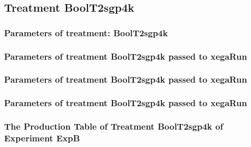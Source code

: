 \documentclass[18pt,c]{beamer}
\makeatletter
\def\beamer@writeslidentry@miniframesoff{%
  \expandafter\beamer@ifempty\expandafter{\beamer@framestartpage}{}%
  {%
   \clearpage\beamer@notesactions%
  }
}
\newcommand*{\miniframesoff}{\let\beamer@writeslidentry=\beamer@writeslidentry@miniframesoff}
\makeatother
\begin{document}
\miniframesoff
\subsection{Treatment BoolT2sgp4k}

 \begin{frame}
 \fontsize{8pt}{9pt}\selectfont
 \frametitle{  Parameters of treatment: BoolT2sgp4k 
 }

 \label{ExpBtParmTable048.tex}  
 \end{frame}


 \begin{frame}
 \fontsize{8pt}{9pt}\selectfont
 \frametitle{  Parameters of treatment BoolT2sgp4k passed to xegaRun
 }

 \label{ExpBtParmTable049.tex}  
 \end{frame}


 \begin{frame}
 \fontsize{8pt}{9pt}\selectfont
 \frametitle{  Parameters of treatment BoolT2sgp4k passed to xegaRun
 }

 \label{ExpBtParmTable050.tex}  
 \end{frame}


 \begin{frame}
 \fontsize{8pt}{9pt}\selectfont
 \frametitle{  Parameters of treatment BoolT2sgp4k passed to xegaRun
 }

 \label{ExpBtParmTable051.tex}  
 \end{frame}

 \begin{frame}
 \fontsize{8pt}{9pt}\selectfont
 \frametitle{ The Production Table of Treatment BoolT2sgp4k of Experiment ExpB }

 \label{ExpBGrammarTable012.tex}  
 \end{frame}
\end{document}
